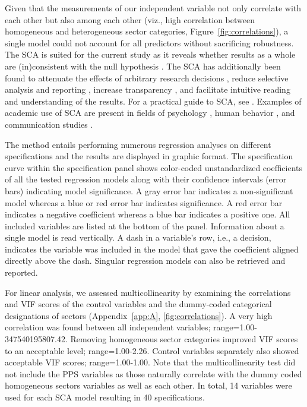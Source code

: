 \documentclass[man]{apa7}
\begin{document}
Given that the measurements of our independent variable not only correlate with each other but also among each other (viz., high correlation between homogeneous and heterogeneous sector categories, Figure~\ref{fig:correlations}), a single model could not account for all predictors without sacrificing robustness. The SCA is suited for the current study as it reveals whether results as a whole are (in)consistent with the null hypothesis \parencite{simonsohn_specification_2015}. The SCA has additionally been found to attenuate the effects of arbitrary research decisions \parencite[i.e., researchers’ degrees of freedom, see][]{babyak_what_2004}, reduce selective analysis and reporting \parencite{huang_beyond_2022}, increase transparency \parencite{jussim_research_2022}, and facilitate intuitive reading and understanding of the results. For a practical guide to SCA, see \Textcite{cosme_specification_2020}. Examples of academic use of SCA are present in fields of psychology \parencite{frey_identifying_2020, rauvola_worker_2023, twenge_specification_2022}, human behavior \parencite{orben_association_2019}, and communication studies \parencite{masur_understanding_2023}.

The method entails performing numerous regression analyses on different specifications and the results are displayed in graphic format. The specification curve within the specification panel shows color-coded unstandardized coefficients of all the tested regression models along with their confidence intervals (error bars) indicating model significance. A gray error bar indicates a non-significant model whereas a blue or red error bar indicates significance. A red error bar indicates a negative coefficient whereas a blue bar indicates a positive one. All included variables are listed at the bottom of the panel. Information about a single model is read vertically. A dash in a variable’s row, i.e., a decision, indicates the variable was included in the model that gave the coefficient aligned directly above the dash. Singular regression models can also be retrieved and reported.

For linear analysis, we assessed multicollinearity by examining the correlations and VIF scores of the control variables and the dummy-coded categorical designations of sectors (Appendix~\ref{app:A}, \ref{fig:correlations}). A very high correlation was found between all independent variables; range=1.00- 347540195807.42. Removing homogeneous sector categories improved VIF scores to an acceptable level; range=1.00-2.26. Control variables separately also showed acceptable VIF scores; range=1.00-1.00. Note that the multicollinearity test did not include the PPS variables as those naturally correlate with the dummy coded homogeneous sectors variables as well as each other. In total, 14 variables were used for each SCA model resulting in 40 specifications.
\end{document}
